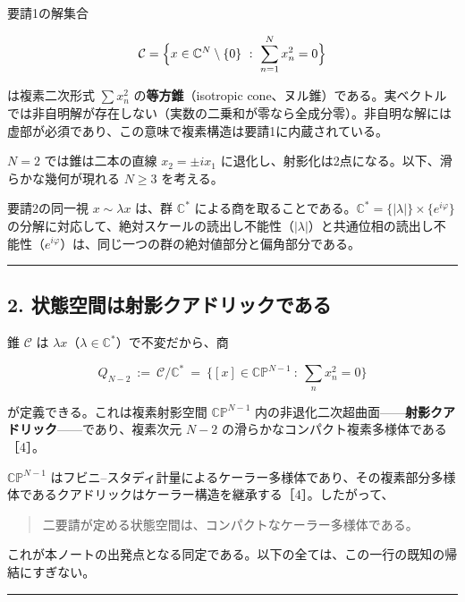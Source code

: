 \documentclass[
  a4paper,
]{ltjsarticle}
\begin{document}
要請1の解集合

\[
\mathcal C=\Bigl\{x\in\mathbb C^N\setminus\{0\}\ :\ \sum_{n=1}^N x_n^2=0\Bigr\}
\]

は複素二次形式 \(\sum x_n^2\) の\textbf{等方錐}（isotropic
cone、ヌル錐）である。実ベクトルでは非自明解が存在しない（実数の二乗和が零なら全成分零）。非自明な解には虚部が必須であり、この意味で複素構造は要請1に内蔵されている。

\(N=2\) では錐は二本の直線 \(x_2=\pm ix_1\)
に退化し、射影化は2点になる。以下、滑らかな幾何が現れる \(N\ge3\)
を考える。

要請2の同一視 \(x\sim\lambda x\) は、群 \(\mathbb C^\ast\)
による商を取ることである。\(\mathbb C^\ast=\{|\lambda|\}\times\{e^{i\varphi}\}\)
の分解に対応して、絶対スケールの読出し不能性（\(|\lambda|\)）と共通位相の読出し不能性（\(e^{i\varphi}\)）は、同じ一つの群の絶対値部分と偏角部分である。

\begin{center}\rule{0.5\linewidth}{0.5pt}\end{center}

\subsection{2.
状態空間は射影クアドリックである}\label{ux72b6ux614bux7a7aux9593ux306fux5c04ux5f71ux30afux30a2ux30c9ux30eaux30c3ux30afux3067ux3042ux308b}

錐 \(\mathcal C\) は
\(\lambda x\)（\(\lambda\in\mathbb C^\ast\)）で不変だから、商

\[
Q_{N-2}\ :=\ \mathcal C/\mathbb C^\ast\ =\ \bigl\{[x]\in\mathbb{CP}^{N-1}\ :\ \textstyle\sum_n x_n^2=0\bigr\}
\]

が定義できる。これは複素射影空間 \(\mathbb{CP}^{N-1}\)
内の非退化二次超曲面------\textbf{射影クアドリック}------であり、複素次元
\(N-2\) の滑らかなコンパクト複素多様体である［4］。

\(\mathbb{CP}^{N-1}\)
はフビニ--スタディ計量によるケーラー多様体であり、その複素部分多様体であるクアドリックはケーラー構造を継承する［4］。したがって、

\begin{quote}
二要請が定める状態空間は、コンパクトなケーラー多様体である。
\end{quote}

これが本ノートの出発点となる同定である。以下の全ては、この一行の既知の帰結にすぎない。

\begin{center}\rule{0.5\linewidth}{0.5pt}\end{center}
\end{document}
